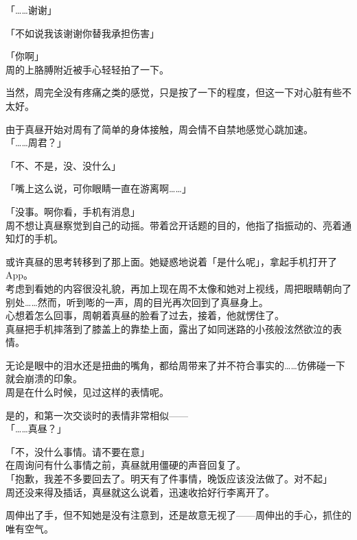 「……谢谢」

「不如说我该谢谢你替我承担伤害」

「你啊」\\

周的上胳膊附近被手心轻轻拍了一下。

当然，周完全没有疼痛之类的感觉，只是按了一下的程度，但这一下对心脏有些不太好。

由于真昼开始对周有了简单的身体接触，周会情不自禁地感觉心跳加速。\\

「……周君？」

「不、不是，没、没什么」

「嘴上这么说，可你眼睛一直在游离啊……」

「没事。啊你看，手机有消息」\\

周不想让真昼察觉到自己的动摇。带着岔开话题的目的，他指了指振动的、亮着通知灯的手机。

或许真昼的思考转移到了那上面。她疑惑地说着「是什么呢」，拿起手机打开了App。\\

考虑到看她的内容很没礼貌，再加上现在周不太像和她对上视线，周把眼睛朝向了别处……然而，听到嘭的一声，周的目光再次回到了真昼身上。\\

心想着怎么回事，周朝着真昼的脸看了过去，接着，他就愣住了。\\

真昼把手机摔落到了膝盖上的靠垫上面，露出了如同迷路的小孩般泫然欲泣的表情。

无论是眼中的泪水还是扭曲的嘴角，都给周带来了并不符合事实的……仿佛碰一下就会崩溃的印象。\\

周是在什么时候，见过这样的表情呢。

是的，和第一次交谈时的表情非常相似——\\

「……真昼？」

「不，没什么事情。请不要在意」\\

在周询问有什么事情之前，真昼就用僵硬的声音回复了。\\

「抱歉，我差不多要回去了。明天有了件事情，晚饭应该没法做了。对不起」\\

周还没来得及插话，真昼就这么说着，迅速收拾好行李离开了。

周伸出了手，但不知她是没有注意到，还是故意无视了——周伸出的手心，抓住的唯有空气。\\

